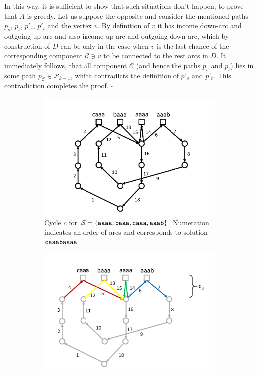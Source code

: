 \documentclass[11pt]{article}
\begin{document}
	In this way, it is sufficient to show that such situations don't happen, to prove that $A$ is greedy. Let us suppose the opposite and consider the mentioned paths $p_s$, $p_t$, $p'_s$, $p'_t$ and the vertex $v$. By definition of $v$ it has income down-arc and outgoing up-arc and also income up-arc and outgoing down-arc, which by construction of $D$ can be only in the case when $v$ is the last chance of the corresponding component $\mathcal{C} \ni v$ to be connected to the rest arcs in $D$. It immediately follows, that all component $\mathcal{C}$ (and hence the paths  $p_s$ and $p_t$) lies in some path $p_{\mathcal{C}} \in \mathcal{P}_{k-1}$, which contradicts the definition of $p'_s$ and $p'_t$. This contradiction completes the proof. $\square$
	
	\begin{figure}[h]
		\centering
		\begin{subfigure}[t]{0.45\textwidth}
			\includegraphics[width=\textwidth]{gha_is_greedy_img/fig1.png}
			\caption{Cycle $c$ for $\mathcal{S} = \{ {\tt aaaa, baaa, caaa, aaab} \}$. Numeration indicates an order of arcs and corresponds to solution $\tt caaabaaaa$.}
			\label{fig:1a}
		\end{subfigure}
		\hfil
		\begin{subfigure}[t]{0.45\textwidth}
			\includegraphics[width=\textwidth]{gha_is_greedy_img/fig2.png}

\end{subfigure}
\end{figure}
\end{document}
